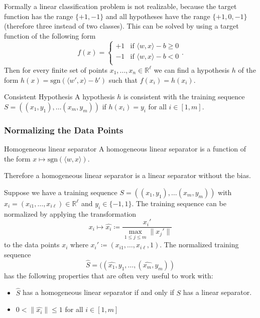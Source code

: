 \documentclass{panikzettel}
\begin{document}
Formally a linear classification problem is not realizable, because the target function has the range $\{+1, -1\}$ and all hypotheses have the range $\{+1, 0, -1\}$ (therefore three instead of two classes). This can be solved by using a target function of the following form
\[
f(x)=
\begin{cases}
+1 & \text{if } \langle w,x\rangle-b \geq 0\\
-1 & \text{if } \langle w,x\rangle-b < 0\\
\end{cases}.
\]
Then for every finite set of points $x_1,...,x_n\in\mathbb{R}^\ell$ we can find a hypothesis $h$ of the form $h(x)=\text{sgn}(\langle w',x\rangle-b')$ such that $f(x_i)=h(x_i)$.

\begin{defi}{Consistent Hypothesis}
A hypothesis $h$ is consistent with the training sequence $S=((x_1,y_1),\ldots (x_m,y_m))$ if $h(x_i)=y_i$ for all $i\in [1,m]$.
\end{defi}

\subsubsection{Normalizing the Data Points}
\begin{defi}{Homogeneous linear separator}
A homogeneous linear separator is a function of the form $x\mapsto \text{sgn}(\langle w,x\rangle)$.
\end{defi}
Therefore a homogeneous linear separator is a linear separator without the bias.



Suppose we have a training sequence $S=((x_1,y_1),\ldots (x_m,y_m))$ with $x_i=(x_{i1},\ldots, x_{i\ell})\in \mathbb{R}^\ell$ and $y_i\in \{-1,1\}$. The training sequence can be normalized by applying the transformation
\[
x_i\mapsto\hat{x_i} \coloneqq \frac{x_i'}{\max_{1\leq j\leq m} \parallel x_j'\parallel}
\]
to the data points $x_i$ where $x_i'\coloneqq (x_{i1},\ldots,x_{i\ell},1)$. The normalized training sequence
\[
\hat{S}=((\widehat{x_1},y_1,\ldots,(\hat{x_m},y_m))
\]
has the following properties that are often very useful to work with:
\begin{itemize}
\item $\widehat{S}$ has a homogeneous linear separator if and only if $S$ has a linear separator.
\item $0<\parallel\widehat{x_i}\parallel\leq 1$ for all $i\in [1,m]$
\end{itemize}
\end{document}

